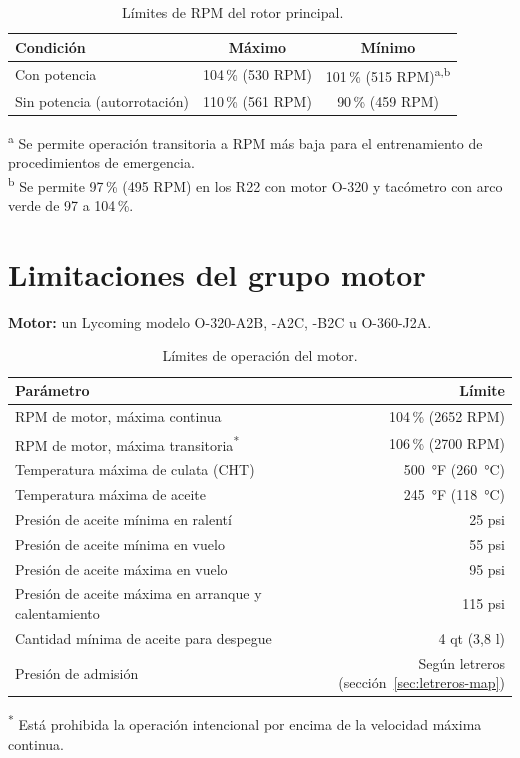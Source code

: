 \begin{table}[htbp]
\centering\small
\caption{Límites de RPM del rotor principal.}
\begin{tabular}{@{}lcc@{}}
\toprule
Condición & Máximo & Mínimo \\
\midrule
Con potencia & 104\,\% (530 RPM) & 101\,\% (515 RPM)\textsuperscript{a,b} \\
Sin potencia (autorrotación) & 110\,\% (561 RPM) & 90\,\% (459 RPM) \\
\bottomrule
\end{tabular}

\smallskip
\begin{minipage}{.92\linewidth}\footnotesize
\textsuperscript{a} Se permite operación transitoria a RPM más baja para el entrenamiento de procedimientos de emergencia.\\
\textsuperscript{b} Se permite 97\,\% (495 RPM) en los R22 con motor O-320 y tacómetro con arco verde de 97 a 104\,\%.
\end{minipage}
\end{table}

\section{Limitaciones del grupo motor}

\textbf{Motor:} un Lycoming modelo O-320-A2B, -A2C, -B2C u O-360-J2A.

\begin{table}[htbp]
\centering\small
\caption{Límites de operación del motor.}
\begin{tabularx}{\linewidth}{@{}Yr@{}}
\toprule
Parámetro & Límite \\
\midrule
RPM de motor, máxima continua & 104\,\% (2652 RPM) \\
RPM de motor, máxima transitoria\textsuperscript{*} & 106\,\% (2700 RPM) \\
Temperatura máxima de culata (CHT) & 500~°F (260~°C) \\
Temperatura máxima de aceite & 245~°F (118~°C) \\
Presión de aceite mínima en ralentí & 25 psi \\
Presión de aceite mínima en vuelo & 55 psi \\
Presión de aceite máxima en vuelo & 95 psi \\
Presión de aceite máxima en arranque y calentamiento & 115 psi \\
Cantidad mínima de aceite para despegue & 4 qt (3,8 l) \\
Presión de admisión & Según letreros (sección~\ref{sec:letreros-map}) \\
\bottomrule
\end{tabularx}

\smallskip
\begin{minipage}{.92\linewidth}\footnotesize
\textsuperscript{*} Está prohibida la operación intencional por encima de la velocidad máxima continua.
\end{minipage}
\end{table}

